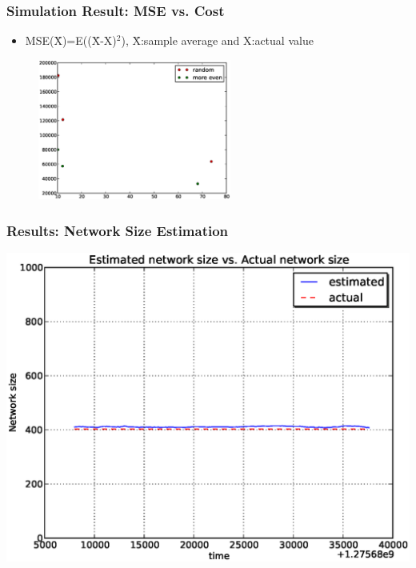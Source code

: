 \documentclass[red]{beamer}
\begin{document}
\begin{frame}
\frametitle{Simulation Result: MSE vs. Cost}
\begin{itemize}
\item MSE(\=X)=E((\=X-X)$^{2}$), \=X:sample average and X:actual value  
\end{itemize}
\begin{figure}
\centering
\includegraphics[width=2.5in,angle=270]{figs/cost_mse1}
\end{figure}
\end{frame}
\begin{frame}
\frametitle{Results: Network Size Estimation}
\begin{center}
\includegraphics[scale=0.4]{figs/plab_size.eps}
\end{center}
\end{frame}
\end{document}

